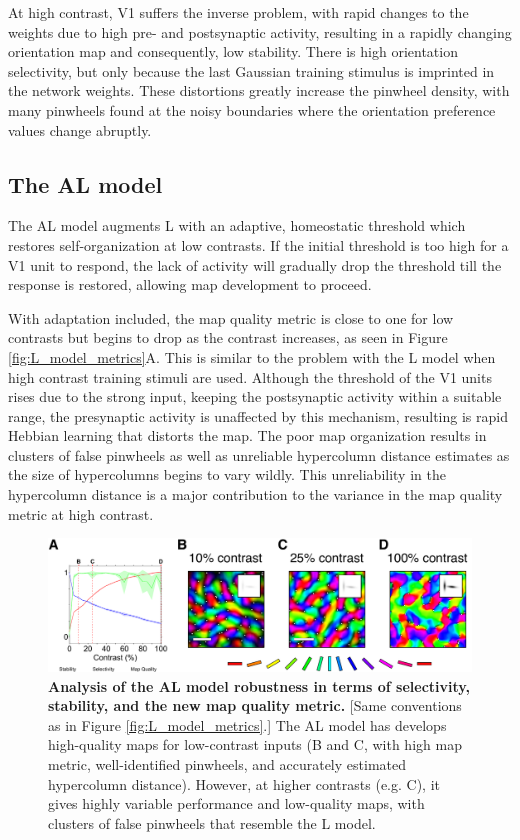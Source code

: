 \documentclass[phd,ianc,twoside]{infthesis}
\begin{document}
At high contrast, V1 suffers the inverse problem, with rapid changes to
the weights due to high pre- and postsynaptic activity, resulting in a
rapidly changing orientation map and consequently, low stability. There
is high orientation selectivity, but only because the last Gaussian training stimulus
is imprinted in the network weights. These distortions greatly increase the
pinwheel density, with many pinwheels found at the noisy boundaries where
the orientation preference values change abruptly.

\subsection{The AL model}

The AL model augments L with an adaptive, homeostatic threshold which
restores self-organization at low contrasts. If the initial threshold is
too high for a V1 unit to respond, the lack of activity will gradually
drop the threshold till the response is restored, allowing map
development to proceed.

With adaptation included, the map quality metric is close to one for low
contrasts but begins to drop as the contrast increases, as seen in
Figure \ref{fig:L_model_metrics}A. This is similar to the problem with
the L model when high contrast training stimuli are used. Although the
threshold of the V1 units rises due to the strong input, keeping the
postsynaptic activity within a suitable range, the presynaptic activity
is unaffected by this mechanism, resulting is rapid Hebbian learning
that distorts the map. The poor map organization results in clusters of
false pinwheels as well as unreliable hypercolumn distance estimates as
the size of hypercolumns begins to vary wildly. This unreliability in
the hypercolumn distance is a major contribution to the variance in the
map quality metric at high contrast.

\begin{figure}
\centerline{
\includegraphics[width=1\textwidth]{./figures/AL.pdf}
}
\caption[]{{\bf Analysis of the AL model robustness in terms of
    selectivity, stability, and the new map quality metric.}
  [Same conventions as in Figure \ref{fig:L_model_metrics}.]
  The AL model has develops high-quality maps for low-contrast inputs
  (B and C, with high map metric, well-identified pinwheels, and
  accurately estimated hypercolumn distance).  However, at higher
  contrasts (e.g. C), it gives highly variable performance and
  low-quality maps, with clusters of false pinwheels that resemble the
  L model.}
\label{fig:AL_model_metrics}
\end{figure}
\end{document}
